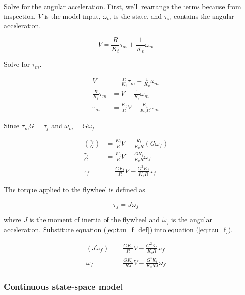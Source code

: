 Solve for the angular acceleration. First, we'll rearrange the terms because
from inspection, $V$ is the model input, $\omega_m$ is the state, and $\tau_m$
contains the angular acceleration.

\begin{equation*}
  V = \frac{R}{K_t} \tau_m + \frac{1}{K_v} \omega_m
\end{equation*}

Solve for $\tau_m$.

\begin{align*}
  V &= \frac{R}{K_t} \tau_m + \frac{1}{K_v} \omega_m \\
  \frac{R}{K_t} \tau_m &= V - \frac{1}{K_v} \omega_m \\
  \tau_m &= \frac{K_t}{R} V - \frac{K_t}{K_v R} \omega_m
\end{align*}

Since $\tau_m G = \tau_f$ and $\omega_m = G \omega_f$

\begin{align}
  \left(\frac{\tau_f}{G}\right) &= \frac{K_t}{R} V -
    \frac{K_t}{K_v R} (G \omega_f) \nonumber \\
  \frac{\tau_f}{G} &= \frac{K_t}{R} V - \frac{G K_t}{K_v R} \omega_f \nonumber
    \\
  \tau_f &= \frac{G K_t}{R} V - \frac{G^2 K_t}{K_v R} \omega_f \label{eq:tau_f}
\end{align}

The torque applied to the flywheel is defined as

\begin{equation}
  \tau_f = J \dot{\omega}_f \label{eq:tau_f_def}
\end{equation}

where $J$ is the moment of inertia of the flywheel and $\dot{\omega}_f$ is the
angular acceleration. Substitute equation (\ref{eq:tau_f_def}) into equation
(\ref{eq:tau_f}).

\begin{align}
  (J \dot{\omega}_f) &= \frac{G K_t}{R} V - \frac{G^2 K_t}{K_v R} \omega_f
    \nonumber \\
  \dot{\omega}_f &= \frac{G K_t}{RJ} V - \frac{G^2 K_t}{K_v RJ} \omega_f
    \label{eq:dot_omega_f}
\end{align}

\subsubsection{Continuous state-space model}

